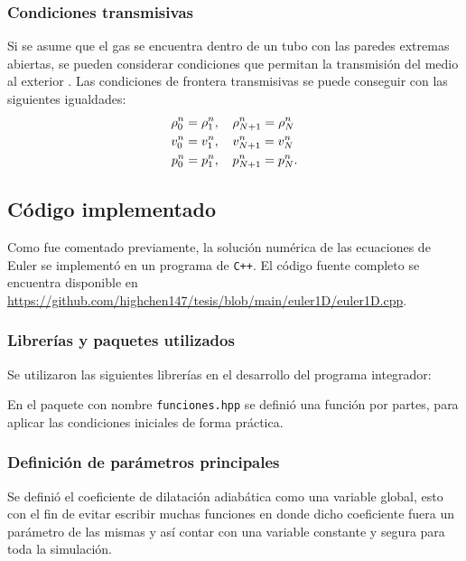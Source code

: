 \subsubsection{Condiciones transmisivas}
Si se asume que el gas se encuentra dentro de un tubo con las paredes extremas abiertas, se pueden considerar condiciones que permitan la transmisión del medio al exterior \cite{thesis-euler-godunov}. Las condiciones de frontera transmisivas se puede conseguir con las siguientes igualdades:
\begin{align}
	\rho_{0}^{n} = \rho_{1}^{n}, \hspace{4mm}&
	\rho_{N+1}^{n} = \rho_{N}^{n} \\
	v_{0}^{n} = v_{1}^{n}, \hspace{4mm}&
	v_{N+1}^{n} = v_{N}^{n} \\
	p_{0}^{n} = p_{1}^{n}, \hspace{4mm}&
	p_{N+1}^{n} = p_{N}^{n}.
\end{align}
\subsection{Código implementado}
\lstset{inputencoding=utf8/latin1}
Como fue comentado previamente, la solución numérica de las ecuaciones de Euler se implementó en un programa de \texttt{C++}. El código fuente completo se encuentra disponible en \url{https://github.com/highchen147/tesis/blob/main/euler1D/euler1D.cpp}.

\subsubsection{Librerías y paquetes utilizados}
Se utilizaron las siguientes librerías en el desarrollo del programa integrador:


En el paquete con nombre \texttt{funciones.hpp} se definió una función por partes, para aplicar las condiciones iniciales de forma práctica.



\subsubsection{Definición de parámetros principales}
Se definió el coeficiente de dilatación adiabática como una variable global, esto con el fin de evitar escribir muchas funciones en donde dicho coeficiente fuera un parámetro de las mismas y así contar con una variable constante y segura para toda la simulación.

